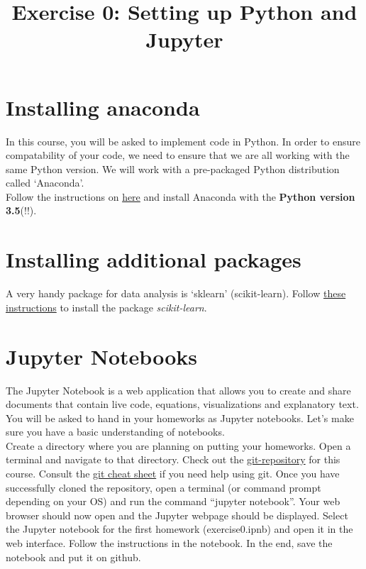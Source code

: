 \documentclass[11pt]{article} %
\title{Exercise 0: Setting up Python and Jupyter}
\begin{document}
\maketitle

\section{Installing anaconda}

In this course, you will be asked to implement code in Python. In order to ensure compatability of your code, we need to ensure that we are all working with the same Python version. We will work with a pre-packaged Python distribution called `Anaconda'.\\

Follow the instructions on \textcolor{blue}{\href{https://www.continuum.io/downloads}{here}} and install Anaconda with the \textbf{Python version 3.5}(!!).


\section{Installing additional packages}
A very handy package for data analysis is `sklearn' (scikit-learn). Follow  \textcolor{blue}{\href{http://conda.pydata.org/docs/test-drive.html\#managing-packages}{these instructions}} to install the package \emph{scikit-learn}.

\newpage
\section{Jupyter Notebooks}
The Jupyter Notebook is a web application that allows you to create and share documents that contain live code, equations, visualizations and explanatory text. You will be asked to hand in your homeworks as Jupyter notebooks. Let's make sure you have a basic understanding of notebooks. \\

Create a directory where you are planning on putting your homeworks. Open a terminal and navigate to that directory. Check out the  \textcolor{blue}{\href{https://github.com/marioberges/F16-12-752}{git-repository}} for this course. Consult the  \textcolor{blue}{\href{https://services.github.com/kit/downloads/github-git-cheat-sheet.pdf}{git cheat sheet}} if you need help using git. Once you have successfully cloned the repository, open a terminal (or command prompt depending on your OS) and run the command ``jupyter notebook''. Your web browser should now open and the Jupyter webpage should be displayed. Select the Jupyter notebook for the first homework (exercise0.ipnb) and open it in the web interface. Follow the instructions in the notebook. In the end, save the notebook and put it on github.
\end{document}
